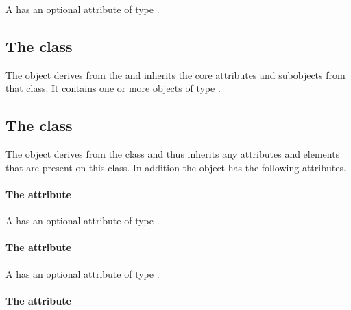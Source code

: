 A \Group has an optional attribute  of type
.


\subsection{The  class}
\label{listofmembers-class}


The \ListOfMembers object derives from the  and inherits
the core attributes and subobjects from that class. It contains one or
more objects of type \Member.

\subsection{The  class}
\label{member-class}




The \Member object derives from the \SBase class and thus inherits any
attributes and elements that are present on this class.
In addition the \Member object has the following attributes.

\paragraph{The \fixttspace{} attribute}

A \Member has an optional attribute  of type
.


\paragraph{The \fixttspace{} attribute}

A \Member has an optional attribute  of type
.


\paragraph{The \fixttspace{} attribute}

